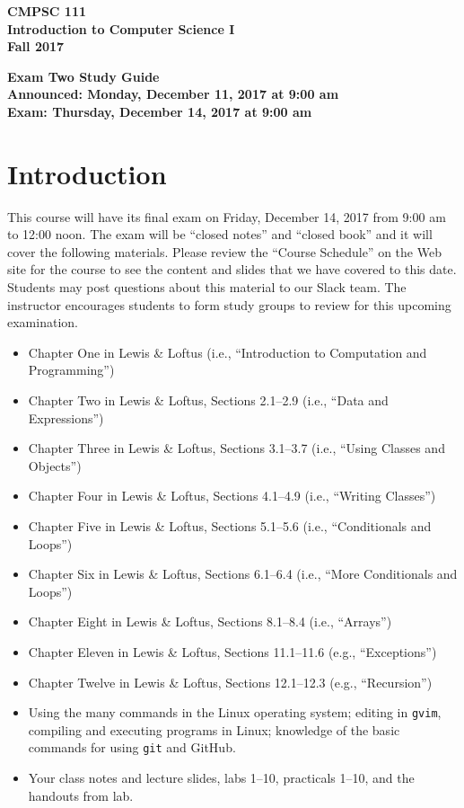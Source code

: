 \documentclass[11pt]{article}
\newcommand{\assignmentduedate}{December 14}
\newcommand{\assignmentassignedate}{December 11}
\newcommand{\assignmentnumber}{Two}
\newcommand{\labyear}{2017}
\newcommand{\assignedday}{Monday}
\newcommand{\dueday}{Thursday}
\newcommand{\labtime}{9:00 am}
\newcommand{\assigneddate}{Announced: \assignedday, \assignmentassignedate, \labyear{} at \labtime{}}
\newcommand{\duedate}{Exam: \dueday, \assignmentduedate, \labyear{} at \labtime{}}
\newcommand{\guidetitle}[1]
{
  \begin{center}
    \begin{center}
      \bf
      CMPSC 111\\Introduction to Computer Science I\\
      Fall 2017\\
      \medskip
    \end{center}
    \bf
    #1
  \end{center}
}
\begin{document}
\guidetitle{Exam \assignmentnumber{} Study Guide \\ \assigneddate{} \\ \duedate{}}

\section*{Introduction}

This course will have its final exam on Friday, \assignmentduedate{}, 2017 from 9:00 am to 12:00 noon. The exam will be
``closed notes'' and ``closed book'' and it will cover the following materials. Please review the ``Course Schedule'' on
the Web site for the course to see the content and slides that we have covered to this date. Students may post questions
about this material to our Slack team. The instructor encourages students to form study groups to review for this
upcoming examination.

\begin{itemize}

  \itemsep 0in

  \item Chapter One in Lewis \& Loftus (i.e., ``Introduction to Computation and Programming'')

  \item Chapter Two in Lewis \& Loftus, Sections 2.1--2.9 (i.e., ``Data and Expressions'')

  \item Chapter Three in Lewis \& Loftus, Sections 3.1--3.7 (i.e., ``Using Classes and Objects'')

  \item Chapter Four in Lewis \& Loftus, Sections 4.1--4.9 (i.e., ``Writing Classes'')

  \item Chapter Five in Lewis \& Loftus, Sections 5.1--5.6 (i.e., ``Conditionals and Loops'')

  \item Chapter Six in Lewis \& Loftus, Sections 6.1--6.4 (i.e., ``More Conditionals and Loops'')

  \item Chapter Eight in Lewis \& Loftus, Sections 8.1--8.4 (i.e., ``Arrays'')

  \item Chapter Eleven in Lewis \& Loftus, Sections 11.1--11.6 (e.g., ``Exceptions'')

  \item Chapter Twelve in Lewis \& Loftus, Sections 12.1--12.3 (e.g., ``Recursion'')

  \item Using the many commands in the Linux operating system; editing in {\tt gvim}, compiling and executing
    programs in Linux; knowledge of the basic commands for using {\tt git} and GitHub.

  \item Your class notes and lecture slides, labs 1--10, practicals 1--10, and the handouts from lab.

\end{itemize}
\end{document}
